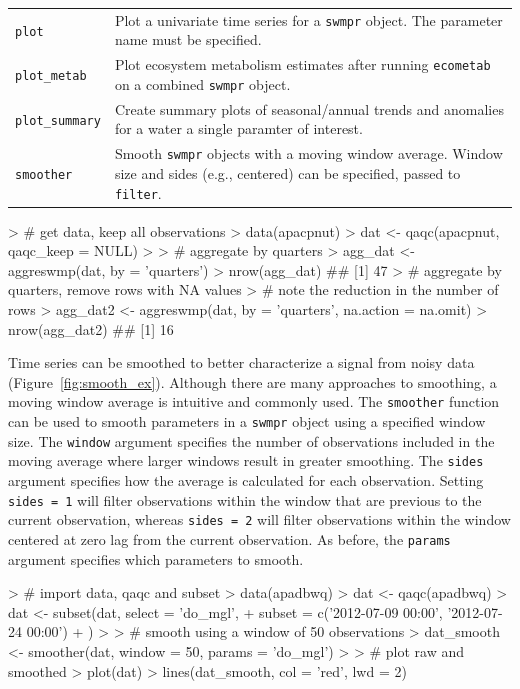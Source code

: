 \begin{table}[!tbp]
\begin{center}
\begin{tabular}{lp{3.5in}}
\texttt{plot}&Plot a univariate  time series for a \texttt{swmpr} object.  The parameter name must be specified.\tabularnewline
\texttt{plot\_metab}&Plot ecosystem metabolism estimates after running \texttt{ecometab} on a combined \texttt{swmpr} object.\tabularnewline
\texttt{plot\_summary}&Create summary plots of seasonal/annual trends and anomalies for a water a single paramter of interest.\tabularnewline
\texttt{smoother}&Smooth \texttt{swmpr} objects with a moving window average.  Window size and sides (e.g., centered) can be specified, passed to \texttt{filter}.\tabularnewline
\hline
\end{tabular}\end{center}

\end{table}


\begin{example}
> # get data, keep all observations
> data(apacpnut)
> dat <- qaqc(apacpnut, qaqc_keep = NULL)
> 
> # aggregate by quarters
> agg_dat <- aggreswmp(dat, by = 'quarters')
> nrow(agg_dat)
## [1] 47
> # aggregate by quarters, remove rows with NA values
> # note the reduction in the number of rows
> agg_dat2 <- aggreswmp(dat, by = 'quarters', na.action = na.omit)
> nrow(agg_dat2)
## [1] 16
\end{example}

Time series can be smoothed to better characterize a signal from noisy data (Figure~\ref{fig:smooth_ex}).  Although there are many approaches to smoothing, a moving window average is intuitive and commonly used.  The \texttt{smoother} function can be used to smooth parameters in a \texttt{swmpr} object using a specified window size.  The \texttt{window} argument specifies the number of observations included in the moving average where larger windows result in greater smoothing.  The \texttt{sides} argument specifies how the average is calculated for each observation.  Setting \texttt{sides = 1} will filter observations within the window that are previous to the current observation, whereas \texttt{sides = 2} will filter observations within the window centered at zero lag from the current observation. As before, the \texttt{params} argument specifies which parameters to smooth.

\begin{example}
> # import data, qaqc and subset
> data(apadbwq)
> dat <- qaqc(apadbwq)
> dat <- subset(dat, select = 'do_mgl', 
+   subset = c('2012-07-09 00:00', '2012-07-24 00:00')
+   )
> 
> # smooth using a window of 50 observations
> dat_smooth <- smoother(dat, window = 50, params = 'do_mgl')
> 
> # plot raw and smoothed
> plot(dat)
> lines(dat_smooth, col = 'red', lwd = 2)
\end{example}


